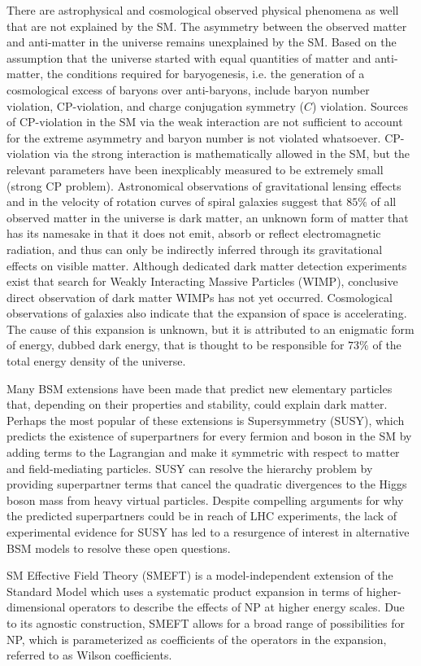There are astrophysical and cosmological observed physical phenomena as well that are not explained by the SM.
The asymmetry between the observed matter and anti-matter in the universe remains unexplained by the SM.
Based on the assumption that the universe started with equal quantities of matter and anti-matter, the conditions required for baryogenesis, i.e. the generation of a cosmological excess of baryons over anti-baryons, include baryon number violation, CP-violation, and charge conjugation symmetry ($C$) violation.
Sources of CP-violation in the SM via the weak interaction are not sufficient to account for the extreme asymmetry and baryon number is not violated whatsoever.
CP-violation via the strong interaction is mathematically allowed in the SM, but the relevant parameters have been inexplicably measured to be extremely small (strong CP problem).
Astronomical observations of gravitational lensing effects and in the velocity of rotation curves of spiral galaxies suggest that $85 \%$ of all observed matter in the universe is dark matter, an unknown form of matter that has its namesake in that it does not emit, absorb or reflect electromagnetic radiation, and thus can only be indirectly inferred through its gravitational effects on visible matter.
Although dedicated dark matter detection experiments exist that search for Weakly Interacting Massive Particles (WIMP), conclusive direct observation of dark matter WIMPs has not yet occurred.
Cosmological observations of galaxies also indicate that the expansion of space is accelerating.
The cause of this expansion is unknown, but it is attributed to an enigmatic form of energy, dubbed dark energy, that is thought to be responsible for $73 \%$ of the total energy density of the universe.

Many BSM extensions have been made that predict new elementary particles that, depending on their properties and stability, could explain dark matter.
Perhaps the most popular of these extensions is Supersymmetry (SUSY), which predicts the existence of superpartners for every fermion and boson in the SM by adding terms to the Lagrangian and make it symmetric with respect to matter and field-mediating particles.
SUSY can resolve the hierarchy problem by providing superpartner terms that cancel the quadratic divergences to the Higgs boson mass from heavy virtual particles.
Despite compelling arguments for why the predicted superpartners could be in reach of LHC experiments, the lack of experimental evidence for SUSY has led to a resurgence of interest in alternative BSM models to resolve these open questions.

SM Effective Field Theory (SMEFT) is a model-independent extension of the Standard Model which uses a systematic product expansion in terms of higher-dimensional operators to describe the effects of NP at higher energy scales.  
Due to its agnostic construction, SMEFT allows for a broad range of possibilities for NP, which is parameterized as coefficients of the operators in the expansion, referred to as Wilson coefficients.

